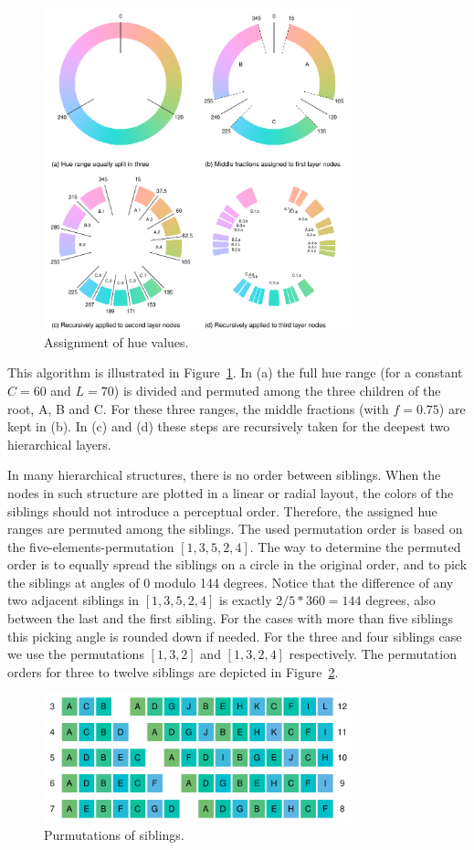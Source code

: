 \documentclass[journal]{vgtc}                %
\begin{document}
\begin{figure}[htb]
  \centering
  \includegraphics[width=3.5in]{hcl_method2.pdf}
  \caption{Assignment of hue values.}\label{fig:wheel}
\end{figure}

This algorithm is illustrated in Figure~\ref{fig:wheel}. In (a) the full hue range (for a constant $C=60$ and $L=70$)  is divided and permuted among the three children of the root, A, B and C. For these three ranges, the middle fractions (with $f=0.75$) are kept in (b).
In (c) and (d) these steps are recursively taken for the deepest two hierarchical layers.

In many hierarchical structures, there is no order between siblings. When the nodes in such structure are plotted in a linear or radial layout, the colors of the siblings should not introduce a perceptual order. Therefore, the assigned hue ranges are permuted among the siblings. The used permutation order is based on the five-elements-permutation $[1, 3, 5, 2, 4]$. The way to determine the permuted order is to equally spread the siblings on a circle in the original order, and to pick the siblings at angles of 0 modulo 144 degrees. Notice that the difference of any two adjacent siblings in $[1, 3, 5, 2, 4]$ is exactly $2/5 * 360=144$ degrees, also between the last and the first sibling. For the cases with more than five siblings this picking angle is rounded down if needed. For the three and four siblings case we use the permutations $[1, 3, 2]$ and $[1, 3, 2, 4]$ respectively. The permutation orders for three to twelve siblings are depicted in Figure~\ref{fig:perm}.

\begin{figure}[htb]
  \centering
  \includegraphics[width=3.5in]{Permutations.pdf}
  \caption{Purmutations of siblings.}\label{fig:perm}
\end{figure}
\end{document}

